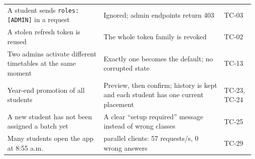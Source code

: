 \begin{longtable}{@{}>{\raggedright\arraybackslash}p{4.2cm}>{\raggedright\arraybackslash}p{7.3cm}>{\raggedright\arraybackslash}p{2.6cm}@{}}
A student sends \texttt{roles:[ADMIN]} in a request & Ignored; admin endpoints return 403 & TC-03\\
A stolen refresh token is reused & The whole token family is revoked & TC-02\\
Two admins activate different timetables at the same moment & Exactly one becomes the default; no corrupted state & TC-13\\
Year-end promotion of all students & Preview, then confirm; history is kept and each student has one current placement & TC-23, TC-24\\
A new student has not been assigned a batch yet & A clear ``setup required'' message instead of wrong classes & TC-25\\
Many students open the app at 8:55 a.m. & 32 parallel clients: 57 requests/s, 0 wrong answers & TC-29\\
\bottomrule
\end{longtable}
\endgroup
